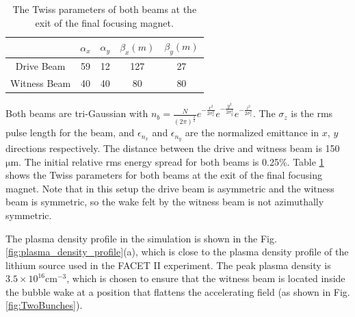 \documentclass[%
reprint, superscriptaddress,
 amsmath,amssymb, aps,
prstab,
]{revtex4-2}
\begin{document}
\begin{table}[htbp] \begin{center}
\begin{tabular}{|c | c c c c|} \hline & $\alpha_x$ & $\alpha_y$&
$\beta_x(m)$ & $\beta_y(m)$ \\ [0.5ex] \hline Drive Beam & 59 & 12 & 127
& 27\\ \hline Witness Beam & 40 & 40 & 80 & 80\\ \hline \end{tabular}
\end{center} \caption{The Twiss parameters of both beams at the exit of
the final focusing magnet.} \label{table2} \end{table}

Both beams are tri-Gaussian with $n_b = \frac{N}{(2 \pi)^{\frac{3}{2}}} e^{-\frac{x^2}{2\sigma_x^2}} e^{-\frac{y^2}{2\sigma_y^2}} e^{-\frac{z^2}{2\sigma_z^2}}$. The $\sigma_z$ is the rms pulse length for the
beam, and $\epsilon_{n_x}$ and $\epsilon_{n_y}$ are the normalized
emittance in $x$, $y$ directions respectively. The distance between the
drive and witness beam is 150 $\mathrm{\mu m}$. The initial relative rms
energy spread for both beams is 0.25\%. Table \ref{table2} shows the
Twiss parameters for both beams at the exit of the final focusing
magnet. Note that in this setup the drive beam is asymmetric and the
witness beam is symmetric, so the wake felt by the witness beam is not azimuthally symmetric.

The plasma density profile in the simulation is shown in the Fig.
\ref{fig:plasma_density_profile}(a), which is close to the plasma density
profile of the lithium source used in the FACET II experiment. The peak plasma density is
$\mathrm{3.5 \times 10^{16} cm^{-3}}$, which is chosen to ensure that the witness beam
is located inside the bubble wake at a position that flattens the
accelerating field (as shown in Fig. \ref{fig:TwoBunches}).
\end{document}
